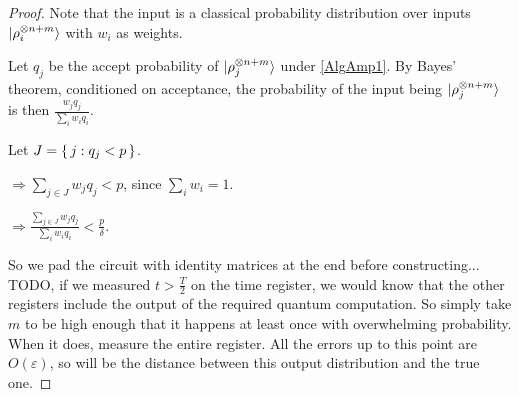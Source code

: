 \begin{proof}
Note that the input is a classical probability distribution over inputs $\ket{\rho_i^{\otimes n+m}}$ with $w_i$ as weights.

Let $q_j$ be the accept probability of $\ket{\rho_j^{\otimes n+m}}$ under \autoref{AlgAmp1}. By Bayes' theorem, conditioned on acceptance, the probability of the input being $\ket{\rho_j^{\otimes n+m}}$ is then $\frac{w_j q_j}{\sum_i w_i q_i}$.

Let $J=\set{j:q_j<p}$.

$\Rightarrow\sum_{j\in J} w_j q_j<p$, since $\sum_i w_i=1$.

$\Rightarrow\frac{\sum_{j\in J} w_j q_j}{\sum_i w_i q_i}<\frac{p}{\delta}$.

So we pad the circuit with identity matrices at the end before constructing... TODO, if we measured $t>\frac{T}{2}$ on the time register, we would know that the other registers include the output of the required quantum computation. So simply take $m$ to be high enough that it happens at least once with overwhelming probability. When it does, measure the entire register. All the errors up to this point are $O(\varepsilon)$, so will be the distance between this output distribution and the true one.

\end{proof}
